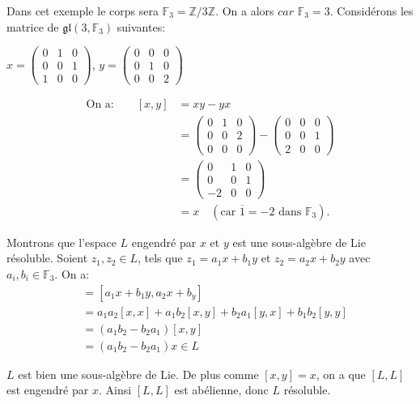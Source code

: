 \documentclass[a4paper,openany,12pt]{report}
\newcommand{\ZZ}{\mathbb{Z}}
\newcommand{\FF}{\mathbb{F}}
\newcommand{\gl}{\mathfrak{gl}}
\theoremstyle{break}
{\theorembodyfont{\upshape}
\newtheorem*{rmq}{Remarque :}
\newtheorem*{prv}{Preuve :}
\newtheorem*{ex}{Exemples :}
\newtheorem*{exe}{Exemple : }
\newtheorem*{nota}{Notation :}
\newtheorem*{dem}{D\'emonstration :}}
\begin{document}
\begin{exe}
\quad Dans cet exemple le corps sera $\FF_3 = \ZZ /3 \ZZ$. On a alors $car$ $\FF_3 = 3$. Considérons les matrice de $\gl(3,\FF_3)$ suivantes: 
\begin{center}
$x = \begin{pmatrix}
0 & 1 & 0 \\
0 & 0 & 1 \\
1 & 0 & 0 
\end{pmatrix}$, \quad
$y = \begin{pmatrix}
0 & 0 & 0 \\
0 & 1 & 0 \\
0 & 0 & 2 
\end{pmatrix}$
\end{center}
\begin{align*}
\text{On a:} \qquad [x,y] & = xy - yx \\
 & = \begin{pmatrix} 
0 & 1 & 0 \\
0 & 0 & 2 \\
0 & 0 & 0 
\end{pmatrix}-\begin{pmatrix}
0 & 0 & 0 \\
0 & 0 & 1 \\
2 & 0 & 0 
\end{pmatrix}\\ & = \begin{pmatrix}
0 & 1 & 0 \\
0 & 0 & 1 \\
-2 & 0 & 0 
\end{pmatrix} \\ & = x \quad 
(\text{car } \overline{1} = -2 \text{ dans } \FF_3).
\end{align*}

Montrons que l'espace $L$ engendré par $x$ et $y$ est une sous-algèbre de Lie résoluble. Soient $z_1,z_2 \in L$, tels que $z_1 = a_1x+b_1y$ et $z_2=a_2x+b_2y$ avec $a_i,b_i \in \FF_3$. On a:
\begin{align*}
[z_1,z_2] &= [a_1x+b_1y,a_2x+b_y]\\
& = a_1a_2[x,x]+a_1b_2[x,y]+b_2a_1[y,x]+b_1b_2[y,y]\\
& = (a_1b_2-b_2a_1)[x,y]\\
& = (a_1b_2-b_2a_1)x \in L
\end{align*}

$L$ est bien une sous-algèbre de Lie. De plus comme $[x,y]=x$, on a que $[L,L]$ est engendré par $x$. Ainsi $[L,L]$ est abélienne, donc $L$ résoluble.


\end{exe}
\end{document}
